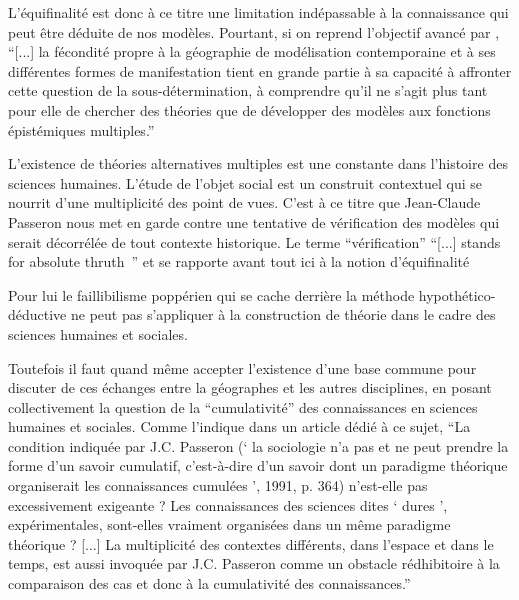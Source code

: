 L'équifinalité est donc à ce titre une limitation indépassable à la connaissance qui peut être déduite de nos modèles. Pourtant, si on reprend l'objectif avancé par \autocite{Varenne2014},  \enquote{[...] la fécondité propre à la géographie de modélisation contemporaine et à ses différentes formes de manifestation tient en grande partie à sa capacité à affronter cette question de la sous-détermination, à comprendre qu’il ne s’agit plus tant pour elle de chercher des théories que de développer des modèles aux fonctions épistémiques multiples.} 

L’existence de théories alternatives multiples est une constante dans l’histoire des sciences humaines. L'étude de l'objet social est un construit contextuel qui se nourrit d'une multiplicité des point de vues. C'est à ce titre que Jean-Claude Passeron \autocite{Passeron2006} nous met en garde contre une tentative de vérification des modèles qui serait décorrélée de tout contexte historique. Le terme \enquote{vérification} \foreignquote{english}{[...] stands for absolute thruth } \autocites{David2009, Oreskes1994} et se rapporte avant tout ici à la notion d'équifinalité \autocite{OSullivan2004} 

Pour lui le faillibilisme poppérien qui se cache derrière la méthode hypothético-déductive ne peut pas s'appliquer à la construction de théorie dans le cadre des sciences humaines et sociales. 

Toutefois il faut quand même accepter l'existence d'une base commune pour discuter de ces échanges entre la géographes et les autres disciplines, en posant collectivement la question de la \enquote{cumulativité}  des connaissances en sciences humaines et sociales. Comme l'indique \textcite{Pumain2005} dans un article dédié à ce sujet, \enquote{La condition indiquée par J.C. Passeron (\enquote{ la sociologie n’a pas et ne peut prendre la forme d’un savoir cumulatif, c’est-à-dire d’un savoir dont un paradigme théorique organiserait les connaissances cumulées }, 1991, p. 364) n’est-elle pas excessivement exigeante ? Les connaissances des sciences dites \enquote{ dures }, expérimentales, sont-elles vraiment organisées dans un même paradigme théorique ? [...] La multiplicité des contextes différents, dans l’espace et dans le temps, est aussi invoquée par J.C. Passeron comme un obstacle rédhibitoire à la comparaison des cas et donc à la cumulativité des connaissances.} 

